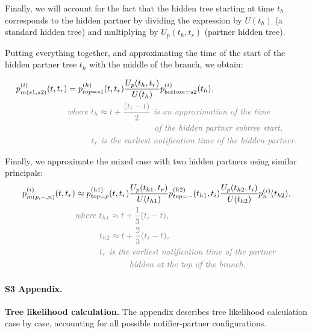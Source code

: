 \documentclass[10pt,letterpaper]{article}
\begin{document}
Finally, we will account for the fact that the hidden tree starting at time $t_h$ corresponds to the hidden partner by dividing the expression by $U(t_h)$ (a standard hidden tree) and multiplying by $U_p(t_h, t_r)$ (partner hidden tree). 

Putting everything together, and approximating the time of the start of the hidden partner tree $t_h$ with the middle of the branch, we obtain: 

\begin{equation}
\begin{split}
p_{m(s1,s2)}^{(i)}(t,t_r) &= p_{top=s1}^{(h)}(t, t_r)\frac{U_p(t_h,t_r)}{U(t_h)}p_{bottom=s2}^{(i)}(t_h)\textit{\color{gray},}\\
&\textit{\color{gray}where $t_{h} \approx t + \frac{(t_i - t)}{2}$ is an approximation of the time}\\
&\textit{\color{gray}~~~~~~~~~~~~~~~~~~~~~~~~~~~~~of the hidden partner subtree start,}\\
&\textit{\color{gray}~~~~~~~~$t_{r}$ is the earliest notification time of the hidden partner.}\\
\end{split}\label{eq:p_mixed_eq}
\end{equation}


Finally, we approximate the mixed case with two hidden partners using similar principals:
\begin{equation}
\begin{split}
p_{m(p,-,n)}^{(i)}(t,t_r) &\approx p_{top=p}^{(h1)}(t, t_r)\frac{U_p(t_{h1},t_{r})}{U(t_{h1})} p_{top=-}^{(h2)}(t_{h1}, t_i)\frac{U_p(t_{h2},t_{i})}{U(t_{h2})} p_n^{(i)}(t_{h2})\textit{\color{gray},}\\
&\textit{\color{gray}where $t_{h1} \approx t + \frac{1}{3}(t_i - t)$,}\\
&\textit{\color{gray}~~~~~~~~$t_{h2} \approx t + \frac{2}{3}(t_i - t)$,}\\
&\textit{\color{gray}~~~~~~~~$t_{r}$ is the earliest notification time of the partner }\\
&\textit{\color{gray}~~~~~~~~~~~~~~~~~~hidden at the top of the branch.}\\
\end{split}\label{eq:p_mixed_mixed}
\end{equation}

\paragraph*{S3 Appendix.}
\label{S3_Appendix}
{\bf Tree likelihood calculation.} The appendix describes tree likelihood calculation case by case, accounting for all possible notifier-partner configurations.
\end{document}
